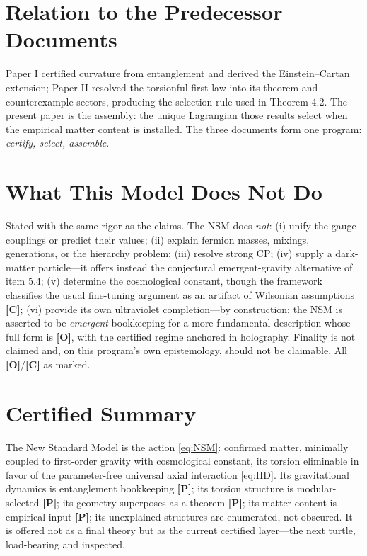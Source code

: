 \documentclass[11pt]{article}
\theoremstyle{definition}
\newcommand{\pP}{\textbf{[P]}}
\newcommand{\pC}{\textbf{[C]}}
\newcommand{\pO}{\textbf{[O]}}
\begin{document}
\section{Relation to the Predecessor Documents}

Paper I \cite{McGwier2026a} certified curvature from entanglement and
derived the Einstein--Cartan extension; Paper II \cite{McGwier2026b}
resolved the torsionful first law into its theorem and counterexample
sectors, producing the selection rule used in Theorem 4.2. The present
paper is the assembly: the unique Lagrangian those results select when the
empirical matter content is installed. The three documents form one
program: \emph{certify, select, assemble}.

\section{What This Model Does Not Do}

Stated with the same rigor as the claims. The NSM does \emph{not}:
(i) unify the gauge couplings or predict their values;
(ii) explain fermion masses, mixings, generations, or the hierarchy
problem; (iii) resolve strong CP; (iv) supply a dark-matter particle---it
offers instead the conjectural emergent-gravity alternative of item 5.4;
(v) determine the cosmological constant, though the framework classifies
the usual fine-tuning argument as an artifact of Wilsonian assumptions
\pC{}; (vi) provide its own ultraviolet completion---by construction: the
NSM is asserted to be \emph{emergent} bookkeeping for a more fundamental
description whose full form is \pO{}, with the certified regime anchored
in holography. Finality is not claimed and, on this program's own
epistemology, should not be claimable. All \pO{}/\pC{} as marked.

\section{Certified Summary}

The New Standard Model is the action \eqref{eq:NSM}: confirmed matter,
minimally coupled to first-order gravity with cosmological constant, its
torsion eliminable in favor of the parameter-free universal axial
interaction \eqref{eq:HD}. Its gravitational dynamics is entanglement
bookkeeping \pP{}; its torsion structure is modular-selected \pP{}; its
geometry superposes as a theorem \pP{}; its matter content is empirical
input \pP{}; its unexplained structures are enumerated, not obscured. It
is offered not as a final theory but as the current certified layer---the
next turtle, load-bearing and inspected.
\end{document}

